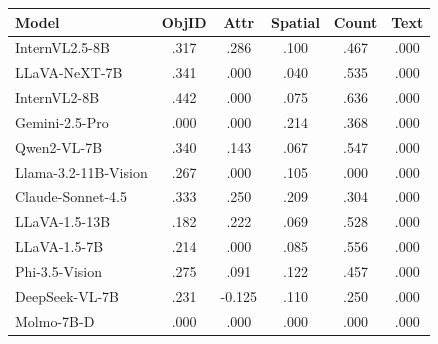 \begin{tabular}{@{}lccccc@{}}
\toprule
Model & ObjID & Attr & Spatial & Count & Text \\
\midrule
InternVL2.5-8B & .317 & .286 & .100 & .467 & .000 \\
LLaVA-NeXT-7B & .341 & .000 & .040 & .535 & .000 \\
InternVL2-8B & .442 & .000 & .075 & .636 & .000 \\
Gemini-2.5-Pro & .000 & .000 & .214 & .368 & .000 \\
Qwen2-VL-7B & .340 & .143 & .067 & .547 & .000 \\
Llama-3.2-11B-Vision & .267 & .000 & .105 & .000 & .000 \\
Claude-Sonnet-4.5 & .333 & .250 & .209 & .304 & .000 \\
LLaVA-1.5-13B & .182 & .222 & .069 & .528 & .000 \\
LLaVA-1.5-7B & .214 & .000 & .085 & .556 & .000 \\
Phi-3.5-Vision & .275 & .091 & .122 & .457 & .000 \\
DeepSeek-VL-7B & .231 & -0.125 & .110 & .250 & .000 \\
Molmo-7B-D & .000 & .000 & .000 & .000 & .000 \\
\bottomrule
\end{tabular}